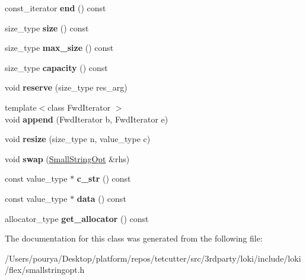 \begin{DoxyCompactItemize}
\item 
\hypertarget{classSmallStringOpt_a0c984f4002881157bfa1eeb38479247e}{}const\+\_\+iterator {\bfseries end} () const \label{classSmallStringOpt_a0c984f4002881157bfa1eeb38479247e}

\item 
\hypertarget{classSmallStringOpt_ac54d37be05fe643189b087e04bb49c7f}{}size\+\_\+type {\bfseries size} () const \label{classSmallStringOpt_ac54d37be05fe643189b087e04bb49c7f}

\item 
\hypertarget{classSmallStringOpt_a2a149ca0d1729e390ff5f825b4138665}{}size\+\_\+type {\bfseries max\+\_\+size} () const \label{classSmallStringOpt_a2a149ca0d1729e390ff5f825b4138665}

\item 
\hypertarget{classSmallStringOpt_a4bb061bdf9c9d1d438e8327a86434bbe}{}size\+\_\+type {\bfseries capacity} () const \label{classSmallStringOpt_a4bb061bdf9c9d1d438e8327a86434bbe}

\item 
\hypertarget{classSmallStringOpt_aa14f9a0fa37edcefafbdcc84ee448817}{}void {\bfseries reserve} (size\+\_\+type res\+\_\+arg)\label{classSmallStringOpt_aa14f9a0fa37edcefafbdcc84ee448817}

\item 
\hypertarget{classSmallStringOpt_a46f984e8700ddbd3c9b58e022f5c77c4}{}{\footnotesize template$<$class Fwd\+Iterator $>$ }\\void {\bfseries append} (Fwd\+Iterator b, Fwd\+Iterator e)\label{classSmallStringOpt_a46f984e8700ddbd3c9b58e022f5c77c4}

\item 
\hypertarget{classSmallStringOpt_a05d1e2c6a65702d55f3bbed60394692f}{}void {\bfseries resize} (size\+\_\+type n, value\+\_\+type c)\label{classSmallStringOpt_a05d1e2c6a65702d55f3bbed60394692f}

\item 
\hypertarget{classSmallStringOpt_a55a4f8360d90262d424641f681632517}{}void {\bfseries swap} (\hyperlink{classSmallStringOpt}{Small\+String\+Opt} \&rhs)\label{classSmallStringOpt_a55a4f8360d90262d424641f681632517}

\item 
\hypertarget{classSmallStringOpt_a548bb73e456f035f5eae1326c23b5884}{}const value\+\_\+type $\ast$ {\bfseries c\+\_\+str} () const \label{classSmallStringOpt_a548bb73e456f035f5eae1326c23b5884}

\item 
\hypertarget{classSmallStringOpt_a4b7a679ae3bf582acec94a2752ae3fb6}{}const value\+\_\+type $\ast$ {\bfseries data} () const \label{classSmallStringOpt_a4b7a679ae3bf582acec94a2752ae3fb6}

\item 
\hypertarget{classSmallStringOpt_a6256080389ad20e56e356b61cf6d8785}{}allocator\+\_\+type {\bfseries get\+\_\+allocator} () const \label{classSmallStringOpt_a6256080389ad20e56e356b61cf6d8785}

\end{DoxyCompactItemize}


The documentation for this class was generated from the following file\+:\begin{DoxyCompactItemize}
\item 
/\+Users/pourya/\+Desktop/platform/repos/tetcutter/src/3rdparty/loki/include/loki/flex/smallstringopt.\+h\end{DoxyCompactItemize}
